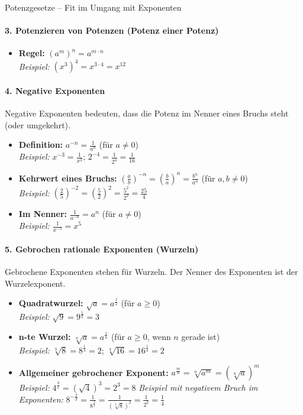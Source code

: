 \begin{erinnerungsboxumgebung}{Potenzgesetze – Fit im Umgang mit Exponenten}
\paragraph{3. Potenzieren von Potenzen (Potenz einer Potenz)}
\begin{itemize}[nosep, leftmargin=2em]
    \item \textbf{Regel:} $(a^m)^n = a^{m \cdot n}$ \\ \textit{Beispiel:} $(x^3)^4 = x^{3 \cdot 4} = x^{12}$
\end{itemize}

\paragraph{4. Negative Exponenten}
Negative Exponenten bedeuten, dass die Potenz im Nenner eines Bruchs steht (oder umgekehrt).
\begin{itemize}[nosep, leftmargin=2em]
    \item \textbf{Definition:} $a^{-n} = \frac{1}{a^n}$ (für $a \neq 0$) \\ \textit{Beispiel:} $x^{-3} = \frac{1}{x^3}$; $2^{-4} = \frac{1}{2^4} = \frac{1}{16}$
    \item \textbf{Kehrwert eines Bruchs:} $\left(\frac{a}{b}\right)^{-n} = \left(\frac{b}{a}\right)^n = \frac{b^n}{a^n}$ (für $a,b \neq 0$) \\ \textit{Beispiel:} $\left(\frac{2}{5}\right)^{-2} = \left(\frac{5}{2}\right)^2 = \frac{5^2}{2^2} = \frac{25}{4}$
    \item \textbf{Im Nenner:} $\frac{1}{a^{-n}} = a^n$ (für $a \neq 0$) \\ \textit{Beispiel:} $\frac{1}{x^{-5}} = x^5$
\end{itemize}

\paragraph{5. Gebrochen rationale Exponenten (Wurzeln)}
Gebrochene Exponenten stehen für Wurzeln. Der Nenner des Exponenten ist der Wurzelexponent.
\begin{itemize}[nosep, leftmargin=2em]
    \item \textbf{Quadratwurzel:} $\sqrt{a} = a^{\frac{1}{2}}$ (für $a \ge 0$) \\ \textit{Beispiel:} $\sqrt{9} = 9^{\frac{1}{2}} = 3$
    \item \textbf{n-te Wurzel:} $\sqrt[n]{a} = a^{\frac{1}{n}}$ (für $a \ge 0$, wenn $n$ gerade ist) \\ \textit{Beispiel:} $\sqrt[3]{8} = 8^{\frac{1}{3}} = 2$; $\sqrt[4]{16} = 16^{\frac{1}{4}} = 2$
    \item \textbf{Allgemeiner gebrochener Exponent:} $a^{\frac{m}{n}} = \sqrt[n]{a^m} = (\sqrt[n]{a})^m$ \\ \textit{Beispiel:} $4^{\frac{3}{2}} = (\sqrt{4})^3 = 2^3 = 8$
    \textit{Beispiel mit negativem Bruch im Exponenten:} $8^{-\frac{2}{3}} = \frac{1}{8^{\frac{2}{3}}} = \frac{1}{(\sqrt[3]{8})^2} = \frac{1}{2^2} = \frac{1}{4}$
\end{itemize}


\end{erinnerungsboxumgebung}
